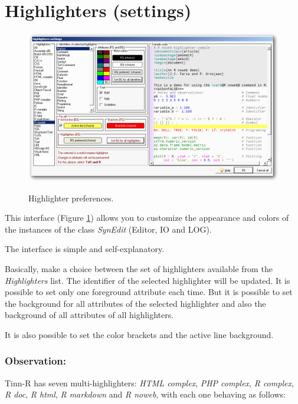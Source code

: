 
\hypertarget{working_highlighters}{}
\section{Highlighters (settings)}

\begin{figure}[h!]
  \includegraphics[scale=0.50]{./res/highlighter_settings.png}\\
  \caption{Highlighter preferences.}
  \label{fig:highlighter_preferences}
\end{figure}

This interface
(Figure \ref{fig:highlighter_preferences})
allows you to customize the appearance and colors of the
instances of the class \textit{SynEdit} (Editor, IO and LOG).

The interface is simple and self-explanatory.

Basically, make a choice between the set of highlighters available
from the \textit{Highlighters} list. The identifier of the selected
highlighter will be updated. It is possible to set only one
foreground attribute each time. But it is possible to set the
background for all attributes of the selected highlighter and also
the background of all attributes of all highlighters.

It is also possible to set the color brackets and the active line
background.


\subsubsection{Observation:}

Tinn-R has seven multi-highlighters: \textit{HTML complex}, \textit{PHP complex},
\textit{R complex}, \textit{R doc},  \textit{R html}, \textit{R markdown} and \textit{R noweb},
with each one behaving as follows:

